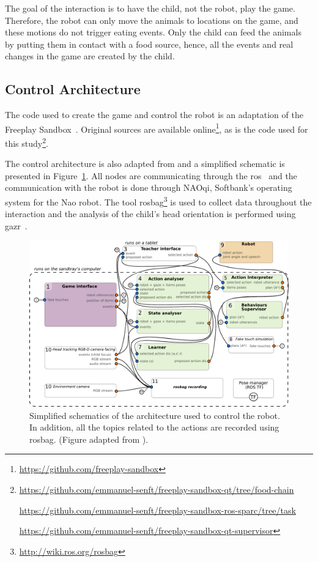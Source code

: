 The goal of the interaction is to have the child, not the robot, play the game. Therefore, the robot can only move the animals to locations on the game, and these motions do not trigger eating events. Only the child can feed the animals by putting them in contact with a food source, hence, all the events and real changes in the game are created by the child. 
\subsection{Control Architecture}\label{sec:tuto_arch}

The code used to create the game and control the robot is an adaptation of the Freeplay Sandbox~\citep{lemaignan2017free}. Original sources are available online\footnote{\url{https://github.com/freeplay-sandbox}}, as is the code used for this study\footnote{\url{https://github.com/emmanuel-senft/freeplay-sandbox-qt/tree/food-chain}
	
\url{https://github.com/emmanuel-senft/freeplay-sandbox-ros-sparc/tree/task}
	
\url{https://github.com/emmanuel-senft/freeplay-sandbox-qt-supervisor}}.

The control architecture is also adapted from \cite{lemaignan2017free} and a simplified schematic is presented in Figure~\ref{fig:tutoring_arch}. All nodes are communicating through the \gls{ros}~\citep{quigley2009ros} and the communication with the robot is done through NAOqi, Softbank's operating system for the Nao robot. The tool rosbag\footnote{\url{http://wiki.ros.org/rosbag}} is used to collect data throughout the interaction and the analysis of the child's head orientation is performed using gazr~\citep{lemaignan2016real}.

\begin{figure}[ht]
	\centering
	\includegraphics[width=1\textwidth]{architecture.pdf}
	\caption{Simplified schematics of the architecture used to control the robot. In addition, all the topics related to the actions are recorded using rosbag. (Figure adapted from \citealt{lemaignan2017free}).}
	\label{fig:tutoring_arch}
\end{figure}

